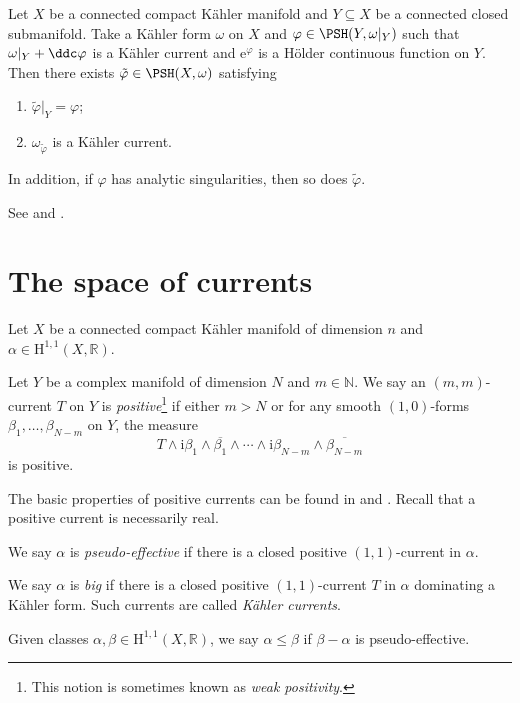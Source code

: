 \begin{theorem}\label{thm:CT-thm-refined'}Let $X$ be a connected compact Kähler manifold and $Y\subseteq X$ be a connected closed submanifold.
    Take a Kähler form $\omega$ on $X$ and $\varphi\in \PSH(Y,\omega|_Y)$ such that $\omega|_Y+\ddc\varphi$ is a Kähler current and $\mathrm{e}^{\varphi}$ is a H\"older continuous function on $Y$.
    Then there exists $\tilde{\varphi}\in \PSH(X,\omega)$ satisfying
    \begin{enumerate}
        \item\label{itm:thm:CT-thm-refined':1} $\tilde{\varphi}|_Y=\varphi$;
        \item\label{itm:thm:CT-thm-refined':2} $\omega_{\tilde{\varphi}}$ is a Kähler current.
    \end{enumerate}
        In addition, if $\varphi$ has analytic singularities, then so does $\tilde{\varphi}$.
\end{theorem}
See \cite[Theorem~6.1]{DRWNXZ} and \cite[Theorem~14.7.12]{FPT}.



\section{The space of currents}
\label{sec:currents}
Let $X$ be a connected compact Kähler manifold of dimension $n$ and $\alpha\in \mathrm{H}^{1,1}(X,\mathbb{R})$.

\begin{definition}\label{def:pos_curr}
    Let $Y$ be a complex manifold of dimension $N$ and $m\in \mathbb{N}$. We say an $(m,m)$-current $T$ on $Y$ is \emph{positive}\footnote{This notion is sometimes known as \emph{weak positivity}.} if either $m>N$ or for any smooth $(1,0)$-forms $\beta_1,\ldots,\beta_{N-m}$ on $Y$, the measure
    \[
    T\wedge \mathrm{i}\beta_1\wedge \overline{\beta_1}\wedge \cdots \wedge \mathrm{i}\beta_{N-m}\wedge \overline{\beta_{N-m}}
    \]
    is positive.
\end{definition}
The basic properties of positive currents can be found in \cite[Section~III.1]{DemBook} and \cite[Section~7.2]{FPT}. Recall that a positive current is necessarily real.

\begin{definition}\label{def:psefclass}
    We say $\alpha$ is \emph{pseudo-effective} if there is a closed positive $(1,1)$-current in $\alpha$.

    We say $\alpha$ is \emph{big} if there is a closed positive $(1,1)$-current $T$ in $\alpha$ dominating a Kähler form. Such currents are called \emph{Kähler currents}.
\end{definition}
Given classes $\alpha,\beta\in \mathrm{H}^{1,1}(X,\mathbb{R})$, we say $\alpha\leq \beta$ if $\beta-\alpha$ is pseudo-effective.

